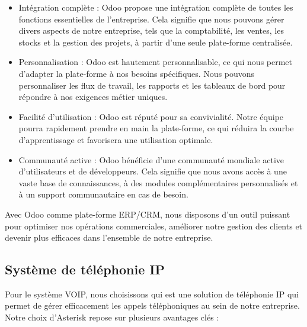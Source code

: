 \begin{itemize}

\item Intégration complète : Odoo propose une intégration complète de toutes les fonctions essentielles de l'entreprise. Cela signifie que nous pouvons gérer divers aspects de notre entreprise, tels que la comptabilité, les ventes, les stocks et la gestion des projets, à partir d'une seule plate-forme centralisée.\\

\item Personnalisation : Odoo est hautement personnalisable, ce qui nous permet d'adapter la plate-forme à nos besoins spécifiques. Nous pouvons personnaliser les flux de travail, les rapports et les tableaux de bord pour répondre à nos exigences métier uniques.\\

\item Facilité d'utilisation : Odoo est réputé pour sa convivialité. Notre équipe pourra rapidement prendre en main la plate-forme, ce qui réduira la courbe d'apprentissage et favorisera une utilisation optimale.\\

\item Communauté active : Odoo bénéficie d'une communauté mondiale active d'utilisateurs et de développeurs. Cela signifie que nous avons accès à une vaste base de connaissances, à des modules complémentaires personnalisés et à un support communautaire en cas de besoin.\\

\end{itemize}

Avec Odoo comme plate-forme ERP/CRM, nous disposons d'un outil puissant pour optimiser nos opérations commerciales, améliorer notre gestion des clients et devenir plus efficaces dans l'ensemble de notre entreprise.\\



\subsection{Système de téléphonie IP}

Pour le système VOIP, nous choisissons qui est une solution de téléphonie IP qui permet de gérer efficacement les appels téléphoniques au sein de notre entreprise. Notre choix d'Asterisk repose sur plusieurs avantages clés :

